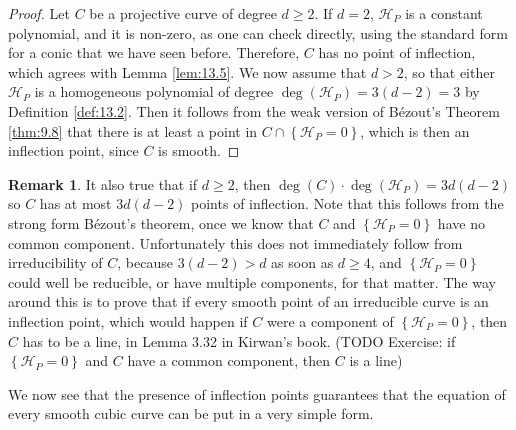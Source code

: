 \documentclass{article}
\newcommand{\rb}[1]{\left( #1 \right)}
\newcommand{\cb}[1]{\left\{ #1 \right\}}
\theoremstyle{definition}\newtheorem{definition}{Definition}[section]
\theoremstyle{definition}\newtheorem{notation}[definition]{Notation}
\theoremstyle{definition}\newtheorem{remark}[definition]{Remark}
\theoremstyle{definition}\newtheorem{example}[definition]{Example}
\theoremstyle{definition}\newtheorem{fact}{Fact}
\theoremstyle{definition}\newtheorem{exercise}{Exercise}
\begin{document}
\begin{proof}
Let $ C $ be a projective curve of degree $ d \ge 2 $. If $ d = 2 $, $ \mathcal{H}_P $ is a constant polynomial, and it is non-zero, as one can check directly, using the standard form for a conic that we have seen before. Therefore, $ C $ has no point of inflection, which agrees with Lemma \ref{lem:13.5}. We now assume that $ d > 2 $, so that either $ \mathcal{H}_P $ is a homogeneous polynomial of degree $ \deg\rb{\mathcal{H}_P} = 3\rb{d - 2} = 3 $ by Definition \ref{def:13.2}. Then it follows from the weak version of Bézout's Theorem \ref{thm:9.8} that there is at least a point in $ C \cap \cb{\mathcal{H}_P = 0} $, which is then an inflection point, since $ C $ is smooth.
\end{proof}

\begin{remark}
It also true that if $ d \ge 2 $, then $ \deg\rb{C} \cdot \deg\rb{\mathcal{H}_P} = 3d\rb{d - 2} $ so $ C $ has at most $ 3d\rb{d - 2} $ points of inflection. Note that this follows from the strong form Bézout's theorem, once we know that $ C $ and $ \cb{\mathcal{H}_P = 0} $ have no common component. Unfortunately this does not immediately follow from irreducibility of $ C $, because $ 3\rb{d - 2} > d $ as soon as $ d \ge 4 $, and $ \cb{\mathcal{H}_P = 0} $ could well be reducible, or have multiple components, for that matter. The way around this is to prove that if every smooth point of an irreducible curve is an inflection point, which would happen if $ C $ were a component of $ \cb{\mathcal{H}_P = 0} $, then $ C $ has to be a line, in Lemma 3.32 in Kirwan's book. (TODO Exercise: if $ \cb{\mathcal{H}_P = 0} $ and $ C $ have a common component, then $ C $ is a line)
\end{remark}

We now see that the presence of inflection points guarantees that the equation of every smooth cubic curve can be put in a very simple form.
\end{document}
